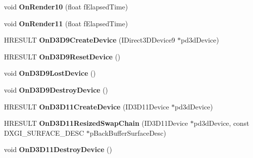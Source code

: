 \begin{DoxyCompactItemize}
\item 
\hypertarget{class_c_d3_d_settings_dlg_a2e26ace9b01227cef11234b4e5a564bb}{void {\bfseries On\+Render10} (float f\+Elapsed\+Time)}\label{class_c_d3_d_settings_dlg_a2e26ace9b01227cef11234b4e5a564bb}

\item 
\hypertarget{class_c_d3_d_settings_dlg_a857de426a74e2be5537fe514f21e387e}{void {\bfseries On\+Render11} (float f\+Elapsed\+Time)}\label{class_c_d3_d_settings_dlg_a857de426a74e2be5537fe514f21e387e}

\item 
\hypertarget{class_c_d3_d_settings_dlg_a35649f54871d23931e67d277ffdb0b7d}{H\+R\+E\+S\+U\+L\+T {\bfseries On\+D3\+D9\+Create\+Device} (I\+Direct3\+D\+Device9 $\ast$pd3d\+Device)}\label{class_c_d3_d_settings_dlg_a35649f54871d23931e67d277ffdb0b7d}

\item 
\hypertarget{class_c_d3_d_settings_dlg_ae64aadfcc9d8d01d14639b049550c1f3}{H\+R\+E\+S\+U\+L\+T {\bfseries On\+D3\+D9\+Reset\+Device} ()}\label{class_c_d3_d_settings_dlg_ae64aadfcc9d8d01d14639b049550c1f3}

\item 
\hypertarget{class_c_d3_d_settings_dlg_aa56dde5f4760807c94d11bac735167f0}{void {\bfseries On\+D3\+D9\+Lost\+Device} ()}\label{class_c_d3_d_settings_dlg_aa56dde5f4760807c94d11bac735167f0}

\item 
\hypertarget{class_c_d3_d_settings_dlg_a72b83969cfd4ec89aa7bdf849dea3c7e}{void {\bfseries On\+D3\+D9\+Destroy\+Device} ()}\label{class_c_d3_d_settings_dlg_a72b83969cfd4ec89aa7bdf849dea3c7e}

\item 
\hypertarget{class_c_d3_d_settings_dlg_a17a2fc4162927d5109eb22ce3ce8236e}{H\+R\+E\+S\+U\+L\+T {\bfseries On\+D3\+D11\+Create\+Device} (I\+D3\+D11\+Device $\ast$pd3d\+Device)}\label{class_c_d3_d_settings_dlg_a17a2fc4162927d5109eb22ce3ce8236e}

\item 
\hypertarget{class_c_d3_d_settings_dlg_a4c2d303f43686e46ef6f862d0ce4b363}{H\+R\+E\+S\+U\+L\+T {\bfseries On\+D3\+D11\+Resized\+Swap\+Chain} (I\+D3\+D11\+Device $\ast$pd3d\+Device, const D\+X\+G\+I\+\_\+\+S\+U\+R\+F\+A\+C\+E\+\_\+\+D\+E\+S\+C $\ast$p\+Back\+Buffer\+Surface\+Desc)}\label{class_c_d3_d_settings_dlg_a4c2d303f43686e46ef6f862d0ce4b363}

\item 
\hypertarget{class_c_d3_d_settings_dlg_a5e9817d6b08c3a859645fe5cb081eb66}{void {\bfseries On\+D3\+D11\+Destroy\+Device} ()}\label{class_c_d3_d_settings_dlg_a5e9817d6b08c3a859645fe5cb081eb66}


\end{DoxyCompactItemize}
